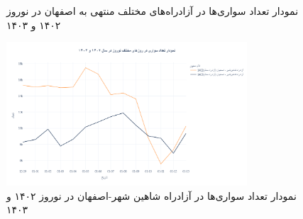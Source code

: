 \documentclass[a4paper, 12pt]{article}
\begin{document}
\begin{figure}[htbp]
    \centering
    \caption{نمودار تعداد سواری‌ها در آزادراه‌های مختلف منتهی به اصفهان در نوروز ۱۴۰۲ و ۱۴۰۳}
\end{figure}
\newpage
\begin{figure}[htbp]
    \centering
    \includegraphics[width=0.8\textwidth]{compare_215104.png}
    \caption{نمودار تعداد سواری‌ها در آزادراه شاهین شهر-اصفهان در نوروز ۱۴۰۲ و ۱۴۰۳}
\end{figure}
\end{document}
